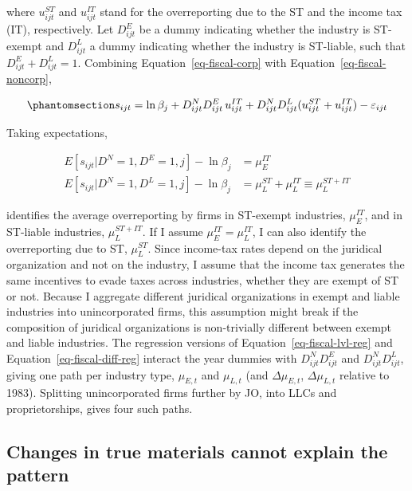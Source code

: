\documentclass[
  12pt,
  letterpaper,
  oneside,
  openany]{report}
\begin{document}
where \(u^{ST}_{ijt}\) and \(u^{IT}_{ijt}\) stand for the overreporting
due to the ST and the income tax (IT), respectively. Let \(D^E_{ijt}\)
be a dummy indicating whether the industry is ST-exempt and
\(D^{L}_{ijt}\) a dummy indicating whether the industry is ST-liable,
such that \(D^E_{ijt} + D^{L}_{ijt} = 1\). Combining
Equation~\ref{eq-fiscal-corp} with Equation~\ref{eq-fiscal-noncorp},

\begin{equation}\protect\phantomsection\label{eq-fiscal-lvl-split}{
    s_{ijt} = \ln\beta_j + D_{ijt}^N D^E_{ijt}\, u^{IT}_{ijt} + D_{ijt}^N D^{L}_{ijt} (u^{ST}_{ijt} + u^{IT}_{ijt}) - \varepsilon_{ijt}
}\end{equation}

Taking expectations,

\[
\begin{aligned}
E[s_{ijt}|D^{N}=1,D^E=1,j]-\ln\beta_j &= \mu^{IT}_E \\
E[s_{ijt}|D^{N}=1,D^{L}=1,j]-\ln\beta_j &= \mu^{ST}_{L}+\mu^{IT}_{L}\equiv\mu^{ST+IT}_{L}
\end{aligned}
\]

identifies the average overreporting by firms in ST-exempt industries,
\(\mu^{IT}_E\), and in ST-liable industries, \(\mu^{ST+IT}_{L}\). If I
assume \(\mu^{IT}_E = \mu^{IT}_{L}\), I can also identify the
overreporting due to ST, \(\mu^{ST}_{L}\). Since income-tax rates depend
on the juridical organization and not on the industry, I assume that the
income tax generates the same incentives to evade taxes across
industries, whether they are exempt of ST or not. Because I aggregate
different juridical organizations in exempt and liable industries into
unincorporated firms, this assumption might break if the composition of
juridical organizations is non-trivially different between exempt and
liable industries. The regression versions of
Equation~\ref{eq-fiscal-lvl-reg} and Equation~\ref{eq-fiscal-diff-reg}
interact the year dummies with \(D^N_{ijt}D^E_{ijt}\) and
\(D^N_{ijt}D^L_{ijt}\), giving one path per industry type, \(\mu_{E,t}\)
and \(\mu_{L,t}\) (and \(\Delta\mu_{E,t}\), \(\Delta\mu_{L,t}\) relative
to 1983). Splitting unincorporated firms further by JO, into LLCs and
proprietorships, gives four such paths.

\subsection{Changes in true materials cannot explain the
pattern}\label{sec-fiscal-m}
\end{document}
